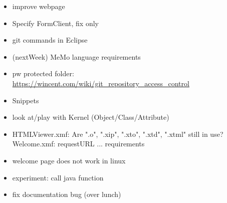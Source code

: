 \begin{itemize}
\item improve webpage
\item Specify FormClient, fix only
\item git commands in Eclipse
\item (nextWeek) MeMo language requirements
\item pw protected folder: \url{https://wincent.com/wiki/git_repository_access_control}
\item Snippets
\item look at/play with Kernel (Object/Class/Attribute)
\item HTMLViewer.xmf: Are ".o", ".xip", ".xto", ".xtd", ".xtml" still in use?
Welcome.xmf: requestURL ...
requirements
\item welcome page does not work in linux
\item experiment: call java function
\item fix documentation bug (over lunch)
\end{itemize}
